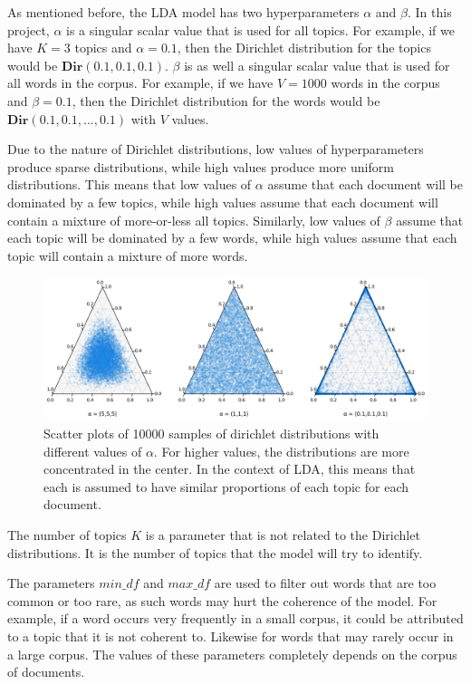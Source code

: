As mentioned before, the LDA model has two hyperparameters $\alpha$ and $\beta$. In this project, $\alpha$ is a singular scalar value that is used for all topics. For example, if we have $K=3$ topics and $\alpha=0.1$, then the Dirichlet distribution for the topics would be $\textbf{Dir}(0.1, 0.1, 0.1)$. $\beta$ is as well a singular scalar value that is used for all words in the corpus. For example, if we have $V=1000$ words in the corpus and $\beta=0.1$, then the Dirichlet distribution for the words would be $\textbf{Dir}(0.1, 0.1, ..., 0.1)$ with $V$ values.

Due to the nature of Dirichlet distributions, low values of hyperparameters produce sparse distributions, while high values produce more uniform distributions. This means that low values of $\alpha$ assume that each document will be dominated by a few topics, while high values assume that each document will contain a mixture of more-or-less all topics. Similarly, low values of $\beta$ assume that each topic will be dominated by a few words, while high values assume that each topic will contain a mixture of more words.

\begin{figure}[h]
    \centering
    \includegraphics[width=1\textwidth]{resources/dirichlet_example.png}
    \caption{Scatter plots of 10000 samples of dirichlet distributions with different values of $\alpha$. For higher values, the distributions are more concentrated in the center. In the context of LDA, this means that each is assumed to have similar proportions of each topic for each document.}
    \label{fig:spelling_error_distribution}
\end{figure}


The number of topics $K$ is a parameter that is not related to the Dirichlet distributions. It is the number of topics that the model will try to identify.

The parameters $min\_df$ and $max\_df$ are used to filter out words that are too common or too rare, as such words may hurt the coherence of the model. For example, if a word occurs very frequently in a small corpus, it could be attributed to a topic that it is not coherent to. Likewise for words that may rarely occur in a large corpus. The values of these parameters completely depends on the corpus of documents.

